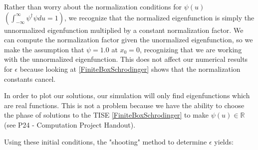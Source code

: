 \documentclass{article}
\begin{document}
Rather than worry about the normalization conditions for $\psi(u)$
$\left(\int_{-\infty}^{\infty}\psi^\dag\psi du = 1\right)$, we recognize that
the normalized eigenfunction is simply the unnormalized eigenfunction
multiplied by a constant normalization factor. We can compute the normalization
factor given the unormalized eigenfunction, so we make the assumption that
$\psi = 1.0$ at $x_0 = 0$, recognizing that we are working with the unnormalized
eigenfunction. This does not affect our numerical results for $\epsilon$
because looking at \eqref{FiniteBoxSchrodinger} shows that the normalization
constants cancel. 

In order to plot our solutions, our simulation will only find eigenfunctions which are
real functions. This is not a problem because we have the ability to choose the phase of 
solutions to the TISE \eqref{FiniteBoxSchrodinger} to make $\psi(u) \in \mathbb{R}$ (see P24 - Computation Project Handout).

Using these initial conditions, the "shooting" method to determine $\epsilon$ yields:
\end{document}
